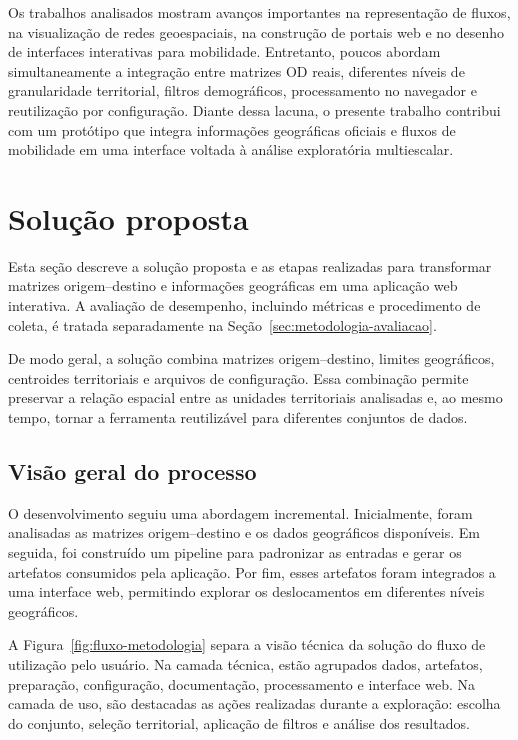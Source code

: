 \documentclass[12pt]{article}
\begin{document}
Os trabalhos analisados mostram avanços importantes na representação de fluxos, na visualização de redes geoespaciais, na construção de portais web e no desenho de interfaces interativas para mobilidade. Entretanto, poucos abordam simultaneamente a integração entre matrizes OD reais, diferentes níveis de granularidade territorial, filtros demográficos, processamento no navegador e reutilização por configuração. Diante dessa lacuna, o presente trabalho contribui com um protótipo que integra informações geográficas oficiais e fluxos de mobilidade em uma interface voltada à análise exploratória multiescalar.



\section{Solução proposta}

Esta seção descreve a solução proposta e as etapas realizadas para transformar matrizes origem--destino e informações geográficas em uma aplicação web interativa. A avaliação de desempenho, incluindo métricas e procedimento de coleta, é tratada separadamente na Seção~\ref{sec:metodologia-avaliacao}.

De modo geral, a solução combina matrizes origem--destino, limites geográficos, centroides territoriais e arquivos de configuração. Essa combinação permite preservar a relação espacial entre as unidades territoriais analisadas e, ao mesmo tempo, tornar a ferramenta reutilizável para diferentes conjuntos de dados.

\subsection{Visão geral do processo}

O desenvolvimento seguiu uma abordagem incremental. Inicialmente, foram analisadas as matrizes origem--destino e os dados geográficos disponíveis. Em seguida, foi construído um pipeline para padronizar as entradas e gerar os artefatos consumidos pela aplicação. Por fim, esses artefatos foram integrados a uma interface web, permitindo explorar os deslocamentos em diferentes níveis geográficos.

A Figura~\ref{fig:fluxo-metodologia} separa a visão técnica da solução do fluxo de utilização pelo usuário. Na camada técnica, estão agrupados dados, artefatos, preparação, configuração, documentação, processamento e interface web. Na camada de uso, são destacadas as ações realizadas durante a exploração: escolha do conjunto, seleção territorial, aplicação de filtros e análise dos resultados.
\end{document}
